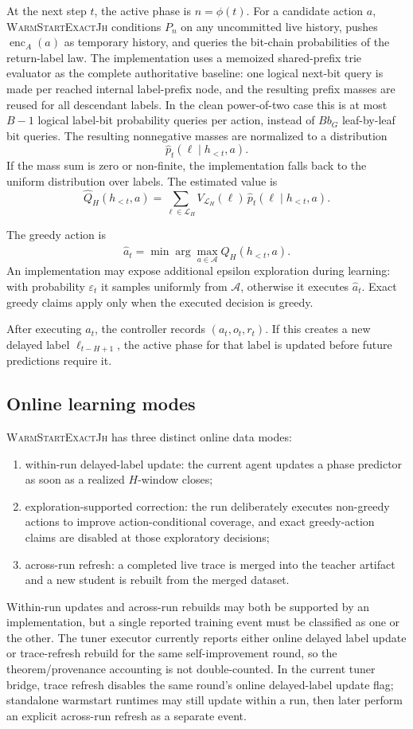 \documentclass[11pt]{article}
\newcommand{\Warm}{\textnormal{\textsc{WarmStartExactJh}}}
\newcommand{\Act}{\mathcal{A}}
\newcommand{\Lab}{\mathcal{L}_H}
\newcommand{\Vlab}{V_{\Lab}}
\begin{document}
At the next step \(t\), the active phase is \(n=\phi(t)\). For a candidate
action \(a\), \Warm{} conditions \(P_n\) on any uncommitted live history,
pushes \(\operatorname{enc}_A(a)\) as temporary history, and queries the
bit-chain probabilities of the return-label law. The implementation uses a
memoized shared-prefix trie evaluator as the complete authoritative baseline:
one logical next-bit query is made per reached internal label-prefix node, and
the resulting prefix masses are reused for all descendant labels. In the clean
power-of-two case this is at most \(B-1\) logical label-bit probability
queries per action, instead of \(B b_G\) leaf-by-leaf bit queries. The
resulting nonnegative masses are normalized to a distribution
\[
\widehat p_t(\ell\mid h_{<t},a).
\]
If the mass sum is zero or non-finite, the implementation falls back to the
uniform distribution over labels. The estimated value is
\[
\widehat Q_H(h_{<t},a)=
\sum_{\ell\in\Lab}\Vlab(\ell)\,
\widehat p_t(\ell\mid h_{<t},a).
\]

The greedy action is
\[
\hat a_t=\min\arg\max_{a\in\Act}\widehat Q_H(h_{<t},a).
\]
An implementation may expose additional epsilon exploration during learning:
with probability \(\varepsilon_t\) it samples uniformly from \(\Act\), otherwise
it executes \(\hat a_t\). Exact greedy claims apply only when the executed
decision is greedy.

After executing \(a_t\), the controller records \((a_t,o_t,r_t)\). If this
creates a new delayed label \(\ell_{t-H+1}\), the active phase for that label
is updated before future predictions require it.

\subsection{Online learning modes}
\label{sec:online-modes}

\Warm{} has three distinct online data modes:
\begin{enumerate}
    \item within-run delayed-label update: the current agent updates a phase
    predictor as soon as a realized \(H\)-window closes;
    \item exploration-supported correction: the run deliberately executes
    non-greedy actions to improve action-conditional coverage, and exact
    greedy-action claims are disabled at those exploratory decisions;
    \item across-run refresh: a completed live trace is merged into the teacher
    artifact and a new student is rebuilt from the merged dataset.
\end{enumerate}
Within-run updates and across-run rebuilds may both be supported by an
implementation, but a single reported training event must be classified as
one or the other. The tuner executor currently reports either online delayed
label update or trace-refresh rebuild for the same self-improvement round, so
the theorem/provenance accounting is not double-counted. In the current tuner
bridge, trace refresh disables the same round's online delayed-label update
flag; standalone warmstart runtimes may still update within a run, then later
perform an explicit across-run refresh as a separate event.
\end{document}
